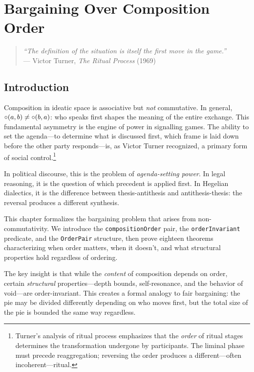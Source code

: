 \chapter{Bargaining Over Composition Order}
\label{ch:bargaining}

\begin{quote}
\textit{``The definition of the situation is itself the first move in the game.''}\\
--- Victor Turner, \textit{The Ritual Process} (1969)
\end{quote}

\vspace{1em}

\section{Introduction}

Composition in ideatic space is associative but \emph{not} commutative.
In general, $\circ(a, b) \neq \circ(b, a)$: who speaks first shapes
the meaning of the entire exchange.  This fundamental asymmetry is the
engine of power in signalling games.  The ability to set the agenda---to
determine what is discussed first, which frame is laid down before the other
party responds---is, as Victor Turner recognized, a primary form of social
control.\footnote{Turner's analysis of ritual process emphasizes that the
\emph{order} of ritual stages determines the transformation undergone by
participants.  The liminal phase must precede reaggregation; reversing the
order produces a different---often incoherent---ritual.}

In political discourse, this is the problem of \emph{agenda-setting power}.
In legal reasoning, it is the question of which precedent is applied first.
In Hegelian dialectics, it is the difference between thesis-antithesis and
antithesis-thesis: the reversal produces a different synthesis.

This chapter formalizes the bargaining problem that arises from
non-commutativity.  We introduce the \texttt{compositionOrder} pair, the
\texttt{orderInvariant} predicate, and the \texttt{OrderPair} structure,
then prove eighteen theorems characterizing when order matters, when it
doesn't, and what structural properties hold regardless of ordering.

The key insight is that while the \emph{content} of composition depends on
order, certain \emph{structural} properties---depth bounds, self-resonance,
and the behavior of void---are order-invariant.  This creates a formal
analogy to fair bargaining: the pie may be divided differently depending on
who moves first, but the total size of the pie is bounded the same way
regardless.

